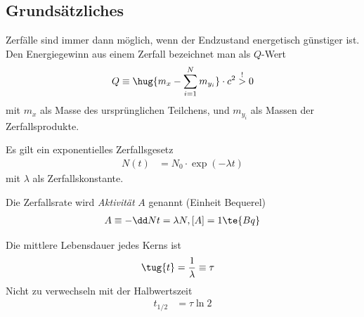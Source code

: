 \documentclass[twocolumn]{summery_4.1}
\begin{document}
\subsection{Grundsätzliches}
Zerfälle sind immer dann möglich, wenn der Endzustand energetisch günstiger ist. Den Energiegewinn aus einem Zerfall bezeichnet man als \(Q\)-Wert
\begin{align*}
    Q\equiv \hug{m_x - \sum_{i=1}^N m_{y_i}}\cdot c^2 \overset!>0
\end{align*} mit \(m_x\) als Masse des ursprünglichen Teilchens, und \(m_{y_i}\) als Massen der Zerfallsprodukte. 

Es gilt ein exponentielles Zerfallsgesetz
\begin{align*}
    N(t) &= N_0 \cdot \exp(-\lambda t)
\end{align*} mit \(\lambda\) als Zerfallskonstante.

Die Zerfallsrate wird \emph{Aktivität} \(A\) genannt (Einheit Bequerel)
\begin{align*}
    A\equiv -\dd Nt = \lambda N , [A]=1\te{Bq}
\end{align*}

Die mittlere Lebensdauer jedes Kerns ist 
\begin{align*}
    \tug{t} &= \frac1 \lambda \equiv \tau 
\end{align*}
Nicht zu verwechseln mit der Halbwertszeit 
\begin{align*}
    t_{1/2} &= \tau \ln 2
\end{align*}
\end{document}

